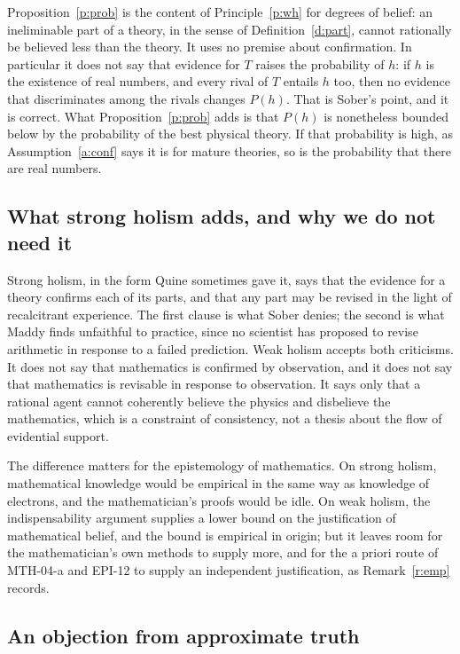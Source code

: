 \documentclass{situationist-preprint}
\begin{document}
Proposition~\ref{p:prob} is the content of Principle~\ref{p:wh} for degrees of belief: an ineliminable part of a theory, in the sense of Definition~\ref{d:part}, cannot rationally be believed less than the theory. It uses no premise about confirmation. In particular it does not say that evidence for $T$ raises the probability of $h$: if $h$ is the existence of real numbers, and every rival of $T$ entails $h$ too, then no evidence that discriminates among the rivals changes $P(h)$. That is Sober's point, and it is correct. What Proposition~\ref{p:prob} adds is that $P(h)$ is nonetheless bounded below by the probability of the best physical theory. If that probability is high, as Assumption~\ref{a:conf} says it is for mature theories, so is the probability that there are real numbers.

\subsection{What strong holism adds, and why we do not need it}

Strong holism, in the form Quine sometimes gave it, says that the evidence for a theory confirms each of its parts, and that any part may be revised in the light of recalcitrant experience. The first clause is what Sober denies; the second is what Maddy finds unfaithful to practice, since no scientist has proposed to revise arithmetic in response to a failed prediction. Weak holism accepts both criticisms. It does not say that mathematics is confirmed by observation, and it does not say that mathematics is revisable in response to observation. It says only that a rational agent cannot coherently believe the physics and disbelieve the mathematics, which is a constraint of consistency, not a thesis about the flow of evidential support.

The difference matters for the epistemology of mathematics. On strong holism, mathematical knowledge would be empirical in the same way as knowledge of electrons, and the mathematician's proofs would be idle. On weak holism, the indispensability argument supplies a lower bound on the justification of mathematical belief, and the bound is empirical in origin; but it leaves room for the mathematician's own methods to supply more, and for the a priori route of MTH-04-a and EPI-12 to supply an independent justification, as Remark~\ref{r:emp} records.

\subsection{An objection from approximate truth}
\end{document}
